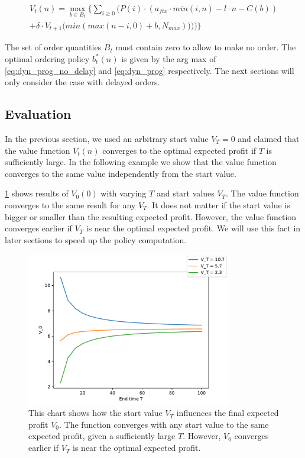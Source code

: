 \begin{equation}
\begin{split}
V_t(n) = \max_{b \in B_t} \Bigg\{
	\sum_{i \geq 0} \Big(
		P(i) \cdot (
			a_{fix} \cdot min(i, n) %
			- l \cdot n %
			- C(b) %
		) \\
		+ \delta \cdot V_{t+1}\big(min(max(n - i, 0) + b, N_{max}))\big)
	\Big)\Bigg\}
\end{split}
\label{eq:dyn_prog}
\end{equation}

The set of order quantities $B_t$ must contain zero to allow to make no order.
The optimal ordering policy $b_t^*(n)$ is given by the arg max of \cref{eq:dyn_prog_no_delay} and \cref{eq:dyn_prog} respectively.
The next sections will only consider the case with delayed orders.

\subsection{Evaluation}
In the previous section, we used an arbitrary start value $V_T = 0$ and claimed that the value function $V_t(n)$ converges to the optimal expected profit if $T$ is sufficiently large.
In the following example we show that the value function converges to the same value independently from the start value.

\cref{fig:convergence} shows results of $V_0(0)$ with varying $T$ and start values $V_T$.
The value function converges to the same result for any $V_T$.
It does not matter if the start value is bigger or smaller than the resulting expected profit.
However, the value function converges earlier if $V_T$ is near the optimal expected profit.
We will use this fact in later sections to speed up the policy computation.

\begin{figure}[t]
\centering
\includegraphics[width=0.8\textwidth]{figures/convergence.pdf}
\caption{This chart shows how the start value $V_T$ influences the final expected profit $V_0$. The function converges with any start value to the same expected profit, given a sufficiently large $T$. However, $V_0$ converges earlier if $V_T$ is near the optimal expected profit.}
\label{fig:convergence}
\end{figure}

